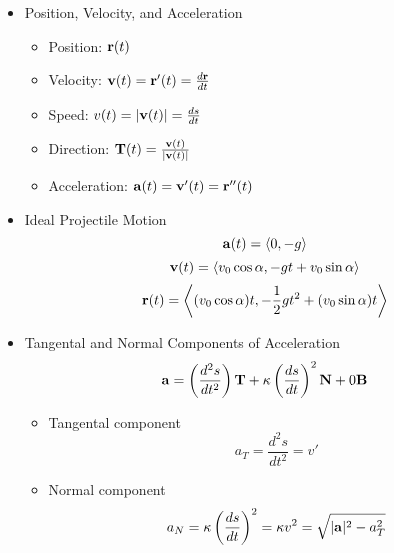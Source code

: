   \begin{itemize}

    \item Position, Velocity, and Acceleration
      \begin{itemize}
      \item Position: $\mathbf{r}(t)$
      \item Velocity: $\mathbf{v}(t) = \mathbf{r}'(t) = \frac{d\mathbf{r}}{dt}$
      \item Speed: $v(t)=|\mathbf{v}(t)|=\frac{ds}{dt}$ 
      \item Direction: $\mathbf{T}(t)=\frac{\mathbf{v}(t)}{|\mathbf{v}(t)|}$ 
      \item Acceleration: $\mathbf{a}(t) = \mathbf{v}'(t) = \mathbf{r}''(t)$ 
      \end{itemize}

    \item Ideal Projectile Motion
      \[\mathbf{a}(t)=\left<0,-g\right>\]
      \[\mathbf{v}(t)=\left<v_0\cos\alpha,-gt+v_0\sin\alpha\right>\]
      \[\mathbf{r}(t)=\left<(v_0\cos\alpha)t,-\frac{1}{2}gt^2+(v_0\sin\alpha)t\right>\]
      
    \item Tangental and Normal Components of Acceleration
      \[\mathbf{a} = \left(\frac{d^2s}{dt^2}\right)\mathbf{T} + \kappa\left(\frac{ds}{dt}\right)^2\mathbf{N}+0\mathbf{B}\]
      \begin{itemize}
        \item Tangental component
          \[a_T = \frac{d^2s}{dt^2} = v' \]
        \item Normal component
          \[a_N = \kappa\left(\frac{ds}{dt}\right)^2 = \kappa v^2 = \sqrt{|\mathbf{a}|^2 - a_T^2}\]
      \end{itemize}
    
      

\end{itemize}
